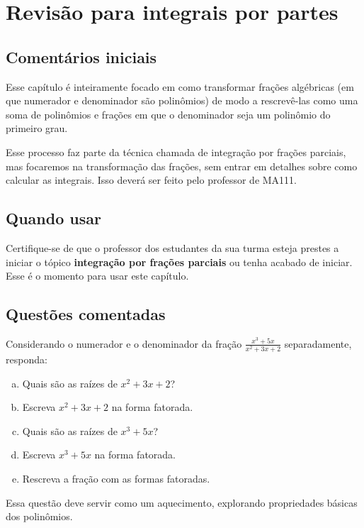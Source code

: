 \documentclass[main_estudante.tex]{subfiles}
\begin{document}
\chapter{Revisão para integrais por partes}

\section{Comentários iniciais}

Esse capítulo é inteiramente focado em como transformar frações algébricas (em que numerador e denominador são polinômios) de modo a rescrevê-las como uma soma de polinômios e frações em que o denominador seja um polinômio do primeiro grau.

Esse processo faz parte da técnica chamada de integração por frações parciais, mas focaremos na transformação das frações, sem entrar em detalhes sobre como calcular as integrais. Isso deverá ser feito pelo professor de MA111.

\section{Quando usar}

Certifique-se de que o professor dos estudantes da sua turma esteja prestes a iniciar o tópico \textbf{integração por frações parciais} ou tenha acabado de iniciar. Esse é o momento para usar este capítulo.

\section{Questões comentadas}

\begin{questao}
Considerando o numerador e o denominador da fração $\frac{x^3+5x}{x^2+3x+2}$ separadamente, responda:
\begin{enumerate}[a)]
\item Quais são as raízes de $x^2+3x+2$?
\item Escreva $x^2+3x+2$ na forma fatorada.
\item Quais são as raízes de $x^3+5x$?
\item Escreva $x^3+5x$ na forma fatorada.
\item Rescreva a fração com as formas fatoradas.
\end{enumerate}
\end{questao}

Essa questão deve servir como um aquecimento, explorando propriedades básicas dos polinômios.
\end{document}
